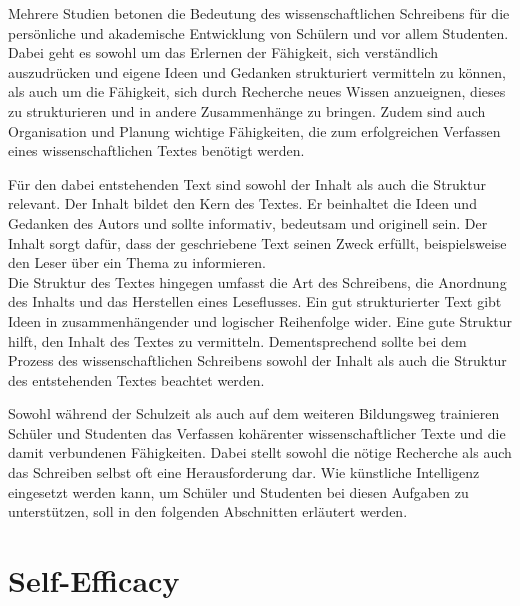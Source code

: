\documentclass[../main.tex]{subfiles}
\begin{document}
Mehrere Studien betonen die Bedeutung des wissenschaftlichen Schreibens für die persönliche und akademische Entwicklung 
von Schülern und vor allem Studenten\cite{influencingUsingAi,ZukunftWissenschaftlichesPublizieren}. Dabei geht es sowohl um das Erlernen der Fähigkeit, sich verständlich auszudrücken und 
eigene Ideen und Gedanken strukturiert vermitteln zu können, als auch um die Fähigkeit, sich durch Recherche neues Wissen 
anzueignen, dieses zu strukturieren und in andere Zusammenhänge zu bringen. Zudem sind auch Organisation und Planung 
wichtige Fähigkeiten, die zum erfolgreichen Verfassen eines wissenschaftlichen Textes benötigt werden. 

Für den dabei entstehenden Text sind sowohl der Inhalt als auch die Struktur relevant. Der Inhalt bildet den Kern des Textes. Er beinhaltet die Ideen und Gedanken des Autors und sollte 
informativ, bedeutsam und originell sein. Der Inhalt sorgt dafür, dass der geschriebene Text seinen Zweck erfüllt, beispielsweise 
den Leser über ein Thema zu informieren. \\
Die Struktur des Textes hingegen umfasst die Art des Schreibens, die Anordnung des Inhalts und das Herstellen eines Leseflusses. 
Ein gut strukturierter Text gibt Ideen in zusammenhängender und logischer Reihenfolge wider. Eine gute Struktur hilft, den Inhalt des
Textes zu vermitteln. Dementsprechend sollte bei dem Prozess des wissenschaftlichen Schreibens sowohl der Inhalt als auch die Struktur des entstehenden 
Textes beachtet werden.\cite{teachers}

Sowohl während der Schulzeit als auch auf dem weiteren Bildungsweg trainieren Schüler und Studenten das Verfassen kohärenter 
wissenschaftlicher Texte und die damit verbundenen Fähigkeiten. Dabei stellt sowohl die nötige Recherche als auch das Schreiben selbst
oft eine Herausforderung dar. Wie künstliche Intelligenz eingesetzt werden kann, um Schüler und Studenten bei diesen Aufgaben zu 
unterstützen, soll in den folgenden Abschnitten erläutert werden. 

\section{Self-Efficacy}
\end{document}
